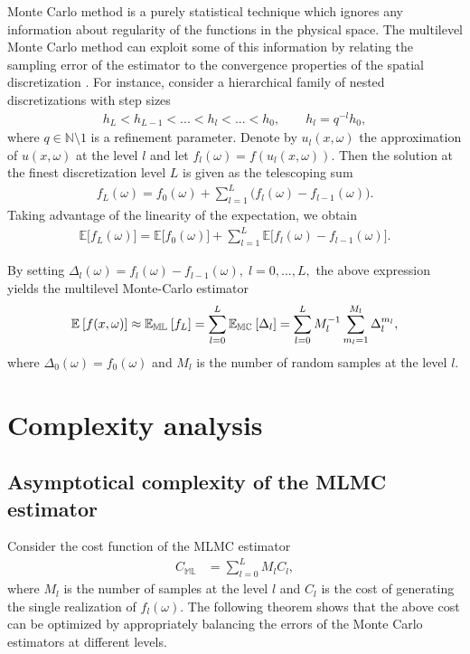 Monte Carlo method is a purely statistical technique which ignores any information about regularity of the functions in the physical space.
The multilevel Monte Carlo method can exploit some of this information by relating the sampling error of the estimator to the convergence properties of the spatial discretization \cite{Giles2008}. 
For instance, consider a hierarchical family of nested discretizations with step sizes
\begin{align*}
	h_L < h_{L-1} < ... < h_l < ... < h_0, \qquad h_l = q^{-l} h_0,
\end{align*}
where $q \in \mathbb{N} \setminus 1$ is a refinement parameter.
Denote by $u_l(x,\omega)$ the approximation of $u(x,\omega)$ at the level $l$ and let $f_{l} (\omega) = f(u_l ({x},\omega))$. Then the solution at the finest discretization level $L$ is given as the telescoping sum
\begin{align*}
	f_{L} (\omega) = f_{0} (\omega) + \sum_{l=1}^L \Big( f_{l} (\omega) - f_{l-1} (\omega) \Big).
\end{align*}
Taking advantage of the linearity of the expectation, we obtain
\begin{align*}
	\mathbb{E} \Big[ f_{L} (\omega) \Big] = \mathbb{E} \Big[ f_{0} (\omega) \Big] + \sum_{l=1}^L \mathbb{E} \Big[ f_{l} (\omega) - f_{l-1} (\omega) \Big].
\end{align*}

By setting
$	
	\Delta_{l} ( \omega )
	= f_{l} ( \omega ) - f_{l-1} ( \omega )
	, \; l=0,...,L,
$
the above expression yields the multilevel Monte-Carlo estimator
\begin{align}\label{eq:MLMC_estimator}
	\mathbb{E}_{{}} \left[ { f({x},\omega) } \right]
	\approx
	\mathbb{E_{ML}}_{{}} \left[ {f_L} \right]
	= \sum_{l=0}^L \mathbb{E_{MC}}_{{}} \left[ {\Delta_{l}} \right]
	= \sum_{l=0}^L M_l^{-1} \sum_{m_l=1}^{M_l} \Delta_{l}^{m_l} 
	,
\end{align}
where $\Delta_{0} ( \omega ) = f_{0} ( \omega )$ and $M_l$ is the number of random samples at the level $l$.



\section{Complexity analysis}
\label{sec:complexity}

\subsection{Asymptotical complexity of the MLMC estimator}

Consider the cost function of the MLMC estimator
\begin{align*}%
	C_{\mathbb{ML}} 
	&= \sum_{l=0}^L M_l {C}_l 
	,
\end{align*}
where $M_l$ is the number of samples at the level $l$  and $C_l$ is the cost of generating the single realization of $f_l(\omega)$.
The following theorem shows that the above cost can be optimized by appropriately balancing the errors of the Monte Carlo estimators at different levels.

